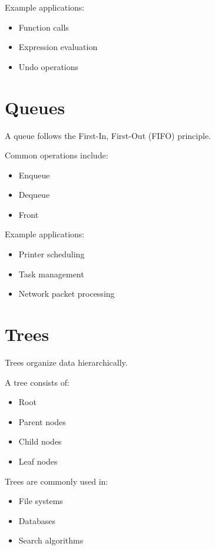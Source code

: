 \documentclass[12pt,openany]{book}
\begin{document}
Example applications:

\begin{itemize}
    \item Function calls
    \item Expression evaluation
    \item Undo operations
\end{itemize}

\section{Queues}

A queue follows the First-In, First-Out (FIFO) principle.

Common operations include:

\begin{itemize}
    \item Enqueue
    \item Dequeue
    \item Front
\end{itemize}

Example applications:

\begin{itemize}
    \item Printer scheduling
    \item Task management
    \item Network packet processing
\end{itemize}

\section{Trees}

Trees organize data hierarchically.

A tree consists of:

\begin{itemize}
    \item Root
    \item Parent nodes
    \item Child nodes
    \item Leaf nodes
\end{itemize}

Trees are commonly used in:

\begin{itemize}
    \item File systems
    \item Databases
    \item Search algorithms
\end{itemize}
\end{document}
